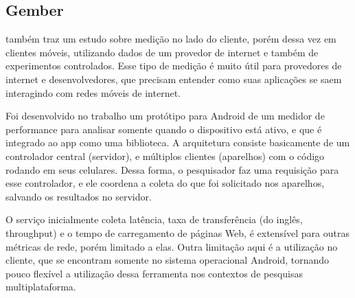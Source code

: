 \documentclass[12pt]{tcc}
\begin{document}
		\subsection{Gember}
		\par \citep{Gember2012Obtaining} também traz um estudo sobre medição no lado do cliente, porém dessa vez em clientes móveis, utilizando dados de um provedor de internet e também de experimentos controlados. Esse tipo de medição é muito útil para provedores de internet e desenvolvedores, que precisam entender como suas aplicações se saem interagindo com redes móveis de internet.
		\par Foi desenvolvido no trabalho um protótipo para Android de um medidor de performance para analisar somente quando o dispositivo está ativo, e que é integrado ao app como uma biblioteca. A arquitetura consiste basicamente de um controlador central (servidor), e múltiplos clientes (aparelhos) com o código rodando em seus celulares. Dessa forma, o pesquisador faz uma requisição para esse controlador, e ele coordena a coleta do que foi solicitado nos aparelhos, salvando os resultados no servidor.
		\par O serviço inicialmente coleta latência, taxa de transferência (do inglês, {throughput}) e o tempo de carregamento de páginas Web, é extensível para outras métricas de rede, porém limitado a elas. Outra limitação aqui é a utilização no cliente, que se encontram somente no sistema operacional Android, tornando pouco flexível a utilização dessa ferramenta nos contextos de pesquisas multiplataforma.
\end{document}
